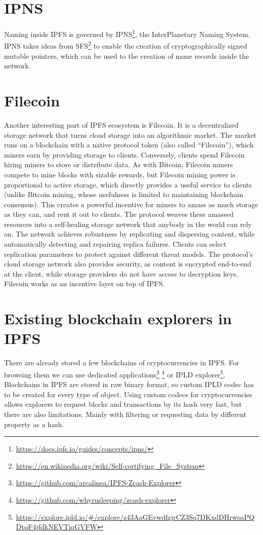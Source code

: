 \section{IPNS}
Naming inside IPFS is governed by IPNS\footnote{\url{https://docs.ipfs.io/guides/concepts/ipns/}}, the InterPlanetary Naming System. IPNS takes ideas from SFS\footnote{\url{https://en.wikipedia.org/wiki/Self-certifying_File_System}} to enable the creation of cryptographically signed mutable pointers, which can be used to the creation of name records inside the network.

\section{Filecoin}
Another interesting part of IPFS ecosystem is Filecoin. It is a decentralized storage network that turns cloud storage into an algorithmic market. The market runs on a blockchain with a native protocol token (also called “Filecoin”), which miners earn by providing storage to clients. Conversely, clients spend Filecoin hiring miners to store or distribute data. As with Bitcoin, Filecoin miners compete to mine blocks with sizable rewards, but Filecoin mining power is proportional to active storage, which directly provides a useful service to clients (unlike Bitcoin mining, whose usefulness is limited to maintaining blockchain consensus). This creates a powerful incentive for miners to amass as much storage as they can, and rent it out to clients. The protocol weaves these amassed resources into a self-healing storage network that anybody in the world can rely on. The network achieves robustness by replicating and dispersing content, while automatically detecting and repairing replica failures. Clients can select replication parameters to protect against different threat models. The protocol’s cloud storage network also provides security, as content is encrypted end-to-end at the client, while storage providers do not have access to decryption keys. Filecoin works as an incentive layer on top of IPFS.\cite{filecoinWhitepaper}

\section{Existing blockchain explorers in IPFS}
There are already stored a few blockchains of cryptocurrencies in IPFS. For browsing them we can use dedicated applications\footnote{\url{https://github.com/arcalinea/IPFS-Zcash-Explorer}} \footnote{\url{https://github.com/whyrusleeping/zcash-explorer}} or IPLD explorer\footnote{\url{https://explore.ipld.io/\#/explore/z43AaGEvwdfzjrCZ3Sq7DKxdDHrwoaPQDtqF4jfdkNEVTiqGVFW}}. Blockchains in IPFS are stored in raw binary format, so custom IPLD codec has to be created for every type of object. Using custom codecs for cryptocurrencies allows explorers to request blocks and transactions by its hash very fast, but there are also limitations. Mainly with filtering or requesting data by different property as a hash.


